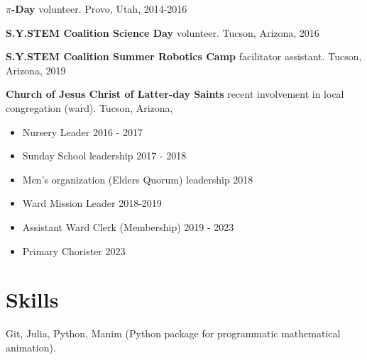 \documentclass{article}
\begin{document}
\textbf{$\pi$-Day} volunteer. Provo, Utah, 2014-2016

\textbf{S.Y.STEM Coalition Science Day} volunteer. Tucson, Arizona, 2016

\textbf{S.Y.STEM Coalition Summer Robotics Camp} facilitator assistant. Tucson, Arizona, 2019

\textbf{Church of Jesus Christ of Latter-day Saints} recent involvement in local congregation (ward). Tucson, Arizona,
\begin{itemize}
    \item Nursery Leader 2016 - 2017
    \item Sunday School leadership 2017 - 2018
    \item Men's organization (Elders Quorum) leadership 2018
    \item Ward Mission Leader 2018-2019
    \item Assistant Ward Clerk (Membership) 2019 - 2023
    \item Primary Chorister 2023
\end{itemize}

\section*{Skills}
Git, Julia, Python, Manim (Python package for programmatic mathematical animation).
\end{document}
